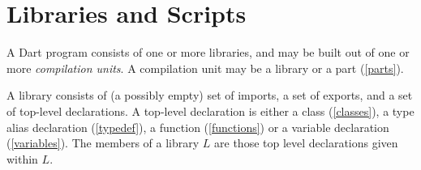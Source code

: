 \documentclass{article}
\newcommand{\code}[1]{{\sf #1}}
\begin{document}






\section{Libraries and Scripts}

\LMHash{}
A Dart program consists of one or more libraries, and may be built out of one or more {\em compilation units}. A compilation unit may be a library or a part (\ref{parts}).

\LMHash{}
A library consists of (a possibly empty) set of imports, a set of exports,  and a set of top-level declarations. A top-level declaration is either a class (\ref{classes}), a type alias declaration (\ref{typedef}), a function (\ref{functions}) or a variable declaration (\ref{variables}). The members of a library $L$ are those top level declarations given within $L$.
\end{document}
